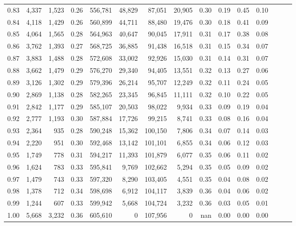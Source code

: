 \begin{tabular}{rrrrrrrrrrrrrrr}
0.83 &   4,337 &  1,523 &  0.26 &  556,781 &   48,829 &   87,051 &   20,905 &  0.30 &  0.19 &  0.45 &      0.10 \\
0.84 &   4,118 &  1,429 &  0.26 &  560,899 &   44,711 &   88,480 &   19,476 &  0.30 &  0.18 &  0.41 &      0.09 \\
0.85 &   4,064 &  1,565 &  0.28 &  564,963 &   40,647 &   90,045 &   17,911 &  0.31 &  0.17 &  0.38 &      0.08 \\
0.86 &   3,762 &  1,393 &  0.27 &  568,725 &   36,885 &   91,438 &   16,518 &  0.31 &  0.15 &  0.34 &      0.07 \\
0.87 &   3,883 &  1,488 &  0.28 &  572,608 &   33,002 &   92,926 &   15,030 &  0.31 &  0.14 &  0.31 &      0.07 \\
0.88 &   3,662 &  1,479 &  0.29 &  576,270 &   29,340 &   94,405 &   13,551 &  0.32 &  0.13 &  0.27 &      0.06 \\
0.89 &   3,126 &  1,302 &  0.29 &  579,396 &   26,214 &   95,707 &   12,249 &  0.32 &  0.11 &  0.24 &      0.05 \\
0.90 &   2,869 &  1,138 &  0.28 &  582,265 &   23,345 &   96,845 &   11,111 &  0.32 &  0.10 &  0.22 &      0.05 \\
0.91 &   2,842 &  1,177 &  0.29 &  585,107 &   20,503 &   98,022 &    9,934 &  0.33 &  0.09 &  0.19 &      0.04 \\
0.92 &   2,777 &  1,193 &  0.30 &  587,884 &   17,726 &   99,215 &    8,741 &  0.33 &  0.08 &  0.16 &      0.04 \\
0.93 &   2,364 &    935 &  0.28 &  590,248 &   15,362 &  100,150 &    7,806 &  0.34 &  0.07 &  0.14 &      0.03 \\
0.94 &   2,220 &    951 &  0.30 &  592,468 &   13,142 &  101,101 &    6,855 &  0.34 &  0.06 &  0.12 &      0.03 \\
0.95 &   1,749 &    778 &  0.31 &  594,217 &   11,393 &  101,879 &    6,077 &  0.35 &  0.06 &  0.11 &      0.02 \\
0.96 &   1,624 &    783 &  0.33 &  595,841 &    9,769 &  102,662 &    5,294 &  0.35 &  0.05 &  0.09 &      0.02 \\
0.97 &   1,479 &    743 &  0.33 &  597,320 &    8,290 &  103,405 &    4,551 &  0.35 &  0.04 &  0.08 &      0.02 \\
0.98 &   1,378 &    712 &  0.34 &  598,698 &    6,912 &  104,117 &    3,839 &  0.36 &  0.04 &  0.06 &      0.02 \\
0.99 &   1,244 &    607 &  0.33 &  599,942 &    5,668 &  104,724 &    3,232 &  0.36 &  0.03 &  0.05 &      0.01 \\
1.00 &   5,668 &  3,232 &  0.36 &  605,610 &        0 &  107,956 &        0 &   nan &  0.00 &  0.00 &      0.00 \\
\bottomrule
\end{tabular}
